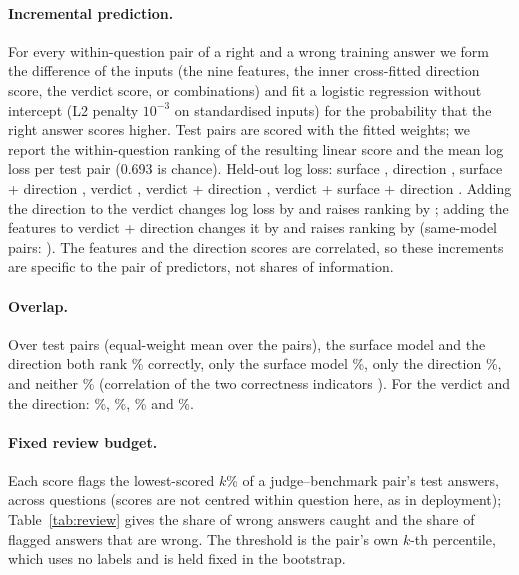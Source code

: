 \paragraph{Incremental prediction.} For every within-question pair of a right and a wrong training answer we form the difference of the inputs (the nine features, the inner cross-fitted direction score, the verdict score, or combinations) and fit a logistic regression without intercept (L2 penalty $10^{-3}$ on standardised inputs) for the probability that the right answer scores higher. Test pairs are scored with the fitted weights; we report the within-question ranking of the resulting linear score and the mean log loss per test pair (0.693 is chance). Held-out log loss: surface , direction , surface + direction , verdict , verdict + direction , verdict + surface + direction . Adding the direction to the verdict changes log loss by  and raises ranking by ; adding the features to verdict + direction changes it by  and raises ranking by  (same-model pairs: ). The features and the direction scores are correlated, so these increments are specific to the pair of predictors, not shares of information.

\paragraph{Overlap.} Over test pairs (equal-weight mean over the  pairs), the surface model and the direction both rank \% correctly, only the surface model \%, only the direction \%, and neither \% (correlation of the two correctness indicators ). For the verdict and the direction: \%, \%, \% and \%.

\paragraph{Fixed review budget.} Each score flags the lowest-scored $k$\% of a judge--benchmark pair's test answers, across questions (scores are not centred within question here, as in deployment); Table~\ref{tab:review} gives the share of wrong answers caught and the share of flagged answers that are wrong. The threshold is the pair's own $k$-th percentile, which uses no labels and is held fixed in the bootstrap.

